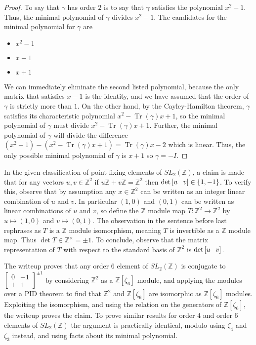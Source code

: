 \documentclass[18pt]{amsart}
\newcommand{\Z}{\mathbb{Z}}
\newcommand{\tbt}[4]{\left[ \begin{smallmatrix}
		#1 & #2 \\
		#3 & #4 
	\end{smallmatrix} \right] }
\newcommand{\Tr}{\operatorname{Tr}}
\begin{document}
	\begin{proof}
		To say that $\gamma$ has order $2$ is to say that $\gamma$ satisfies the polynomial $x^2-1$. Thus, the minimal polynomial of $\gamma$ divides $x^2-1$. The candidates for the minimal polynomial for $\gamma$ are
		\begin{itemize}
			\item $x^2-1$
			\item $x-1$
			\item $x+1$
		\end{itemize}
		We can immediately eliminate the second listed polynomial, because the only matrix that satisfies $x-1$ is the identity, and we have assumed that the order of $\gamma$ is strictly more than $1$. On the other hand, by the Cayley-Hamilton theorem, $\gamma$ satisfies its characteristic polynomial $x^2-\Tr(\gamma)x+1$, so the minimal polynomial of $\gamma$ must divide $x^2-\Tr(\gamma)x+1$. Further, the minimal polynomial of $\gamma$ will divide the difference $(x^2-1)-(x^2-\Tr(\gamma)x+1)=\Tr(\gamma)x-2$ which is linear. Thus, the only possible minimal polynomial of $\gamma$ is $x+1$ so $\gamma=-I$.
	\end{proof}
In the given classification of point fixing elements of $SL_2(\Z)$, a claim is made that for any vectors $u,v \in \Z^2$ if $u\Z+v\Z=\Z^2$ then $\det \left[ u \hspace{8 pt} v\right]\in \{1,-1\}$. To verify this, observe that by assumption any $x\in \Z^2$ can be written as an integer linear combination of $u$ and $v$. In particular $(1,0)$ and $(0,1)$ can be written as linear combinations of $u$ and $v$, so define the $\Z$ module map $T:\Z^2\to \Z^2$ by $u\mapsto (1,0)$ and $v\mapsto (0,1)$. The observation in the sentence before last rephrases as $T$ is a $\Z$ module isomorphism, meaning $T$ is invertible as a $\Z$ module map. Thus $\det T \in \Z^\times ={\pm 1}$. To conclude, observe that the matrix representation of $T$ with respect to the standard basis of $\Z^2$ is $\det \left[ u \hspace{8 pt} v\right]$.

The writeup proves that any order $6$ element of $SL_2(\Z)$ is conjugate to $\tbt{0}{-1}{1}{1} ^{\pm 1}$ by considering $\Z^2$ as a $\Z[\zeta_6]$ module, and applying the modules over a PID theorem to find that $\Z^2$ and $\Z[\zeta_6]$ are isomorphic as $\Z[\zeta_6]$ modules. Exploiting the isomorphism, and using the relation on the generators of $\Z[\zeta_6]$, the writeup proves the claim. To prove similar results for order $4$ and order $6$ elements of $SL_2 (\Z)$ the argument is practically identical, modulo using $\zeta_4$  and $\zeta_3$ instead, and using facts about its minimal polynomial.
\end{document}
